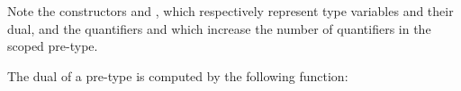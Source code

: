 Note the constructors  and
, which respectively represent type variables and
their dual, and the quantifiers  and
 which increase the number of quantifiers in the
scoped pre-type.

The dual of a pre-type is computed by the following function:

\begin{code}%
\>[0]\AgdaSpace{}%
\AgdaSymbol{:}\AgdaSpace{}%
\AgdaSymbol{\}}\AgdaSpace{}%
\AgdaSpace{}%
\AgdaSpace{}%
\AgdaSpace{}%
\AgdaSpace{}%
\AgdaSpace{}%
\<%
\\
\>[0]\AgdaSpace{}%
%
\>[14]\AgdaSymbol{=}\AgdaSpace{}%
\<%
\\
\>[0]\AgdaSpace{}%
%
\>[14]\AgdaSymbol{=}\AgdaSpace{}%
\<%
\\
\>[0]\AgdaSpace{}%
%
\>[14]\AgdaSymbol{=}\AgdaSpace{}%
\<%
\\
\>[0]\AgdaSpace{}%
%
\>[14]\AgdaSymbol{=}\AgdaSpace{}%
\<%
\\
\>[0]\AgdaSpace{}%
\AgdaSymbol{(}\AgdaSpace{}%
\AgdaSymbol{)}%
\>[14]\AgdaSymbol{=}\AgdaSpace{}%
\AgdaSpace{}%
\<%
\\
\>[0]\AgdaSpace{}%
\AgdaSymbol{(}\AgdaSpace{}%
\AgdaSymbol{)}%
\>[14]\AgdaSymbol{=}\AgdaSpace{}%
\AgdaSpace{}%
\<%
\\
\>[0]\AgdaSpace{}%
\AgdaSymbol{(}\AgdaSpace{}%
\AgdaOperator{\AgdaInductiveConstructor{\&}}\AgdaSpace{}%
\AgdaSymbol{)}%
\>[14]\AgdaSymbol{=}\AgdaSpace{}%
\AgdaSpace{}%
\AgdaSpace{}%
\AgdaSpace{}%
\AgdaSpace{}%
\<%
\\
\>[0]\AgdaSpace{}%
\AgdaSymbol{(}\AgdaSpace{}%
\AgdaSpace{}%

\end{code}
